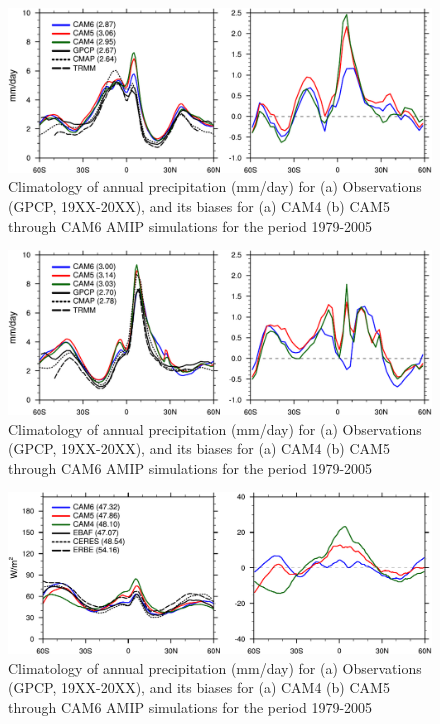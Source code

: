 \clearpage
\begin{figure}[t]
  \begin{center}
    \includegraphics[width=1.\textwidth,angle=0.]{./figs/f_PRECT_1D_DJF_CAM456.pdf}
  \end{center}
  \caption{Climatology of annual precipitation (mm/day) for (a) Observations (GPCP, 19XX-20XX), and its biases for (a) CAM4 (b) CAM5  through CAM6 AMIP simulations for the period 1979-2005} 
\label{f_PRECT_1D_DJF_CAM456}
\end{figure} 
\clearpage
\begin{figure}[t]
  \begin{center}
    \includegraphics[width=1.\textwidth,angle=0.]{./figs/f_PRECT_1D_JJA_CAM456.pdf}
  \end{center}
  \caption{Climatology of annual precipitation (mm/day) for (a) Observations (GPCP, 19XX-20XX), and its biases for (a) CAM4 (b) CAM5  through CAM6 AMIP simulations for the period 1979-2005} 
\label{f_PRECT_1D_JJA_CAM456}
\end{figure} 

\clearpage
\begin{figure}[t]
  \begin{center}
    \includegraphics[width=1.\textwidth,angle=0.]{./figs/f_SWCF_1D_ANN_CAM456.pdf}
  \end{center}
  \caption{Climatology of annual precipitation (mm/day) for (a) Observations (GPCP, 19XX-20XX), and its biases for (a) CAM4 (b) CAM5  through CAM6 AMIP simulations for the period 1979-2005} 
\label{f_SWCF_1D_ANN_CAM456}
\end{figure} 


